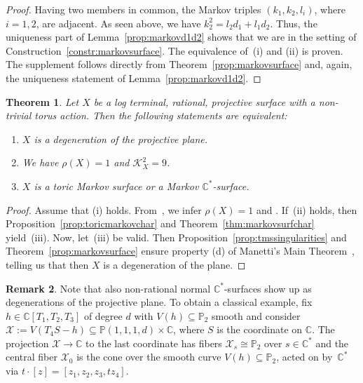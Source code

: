 \documentclass[pdftex]{sigma}
\newtheorem{thm}{Theorem}[section]
\theoremstyle{definition}
\newtheorem{rem}[thm]{Remark}
\def\CC{{\mathbb C}}
\def\PP{{\mathbb P}}
\begin{document}
\begin{proof}
Having two members in common, the
Markov triples $(k_1,k_2,l_i)$,
where $i=1,2$, are adjacent.
As seen above, we have $k_2^2 = l_2d_1 + l_1d_2$.
Thus, the uniqueness part of
Lemma~\ref{prop:markovd1d2} shows
that we are in the setting of
Construction~\ref{constr:markovsurface}.
The equivalence of~(i) and (ii) is proven.
The supplement follows directly from
Theorem~\ref{prop:markovsurface}
and, again, the uniqueness statement of
Lemma~\ref{prop:markovd1d2}.
\end{proof}

\begin{thm}
\label{cor:planedegs}
Let $X$ be a log terminal,
rational, projective surface with a non-trivial
torus action.
Then the following statements are equivalent:
\begin{enumerate}\itemsep=0pt
\item[$(i)$]
$X$ is a degeneration of the projective
plane.
\item[$(ii)$]
We have $\rho(X) = 1$ and $\mathcal{K}_X^2 = 9$.
\item[$(iii)$]
$X$ is a toric Markov surface or a
Markov $\CC^*$-surface.
\end{enumerate}
\end{thm}

\begin{proof}
Assume that (i) holds.
From~\cite[Theorem~4, Corollary~5]{Ma}, we infer
$\rho(X)=1$ and .
If~(ii) holds, then Proposition~\ref{prop:toricmarkovchar}
and Theorem~\ref{thm:markovsurfchar}
yield~(iii).
Now, let~(iii) be valid.
Then Proposition~\ref{prop:tmssingularities}
and
Theorem~\ref{prop:markovsurface}
ensure property (d) of Manetti's
Main Theorem~\mbox{\cite[p.~90]{Ma}},
telling us that then $X$ is
a degeneration of the plane.
\end{proof}

\begin{rem}
Note that also non-rational normal $\CC^*$-surfaces
show up as degenerations of the projective plane.
To obtain a classical example, fix $h \in \CC[T_1,T_2,T_3]$
of degree $d$ with $V(h) \subseteq \PP_2$ smooth and
consider
$
\mathcal{X}
 :=
V(T_4S - h)
 \subseteq
\PP(1,1,1,d) \times \CC$,
where $S$ is the coordinate on $\CC$. The projection
$\mathcal{X} \to \CC$ to the last coordinate has fibers
$\mathcal{X}_s \cong \PP_2$ over $s \in \CC^*$ and
the central fiber $\mathcal{X}_0$ is the cone over
the smooth curve $V(h) \subseteq \PP_2$, acted on by~$\CC^*$
via $t \cdot [z] = [z_1,z_2,z_3,tz_4]$.
\end{rem}
\end{document}
